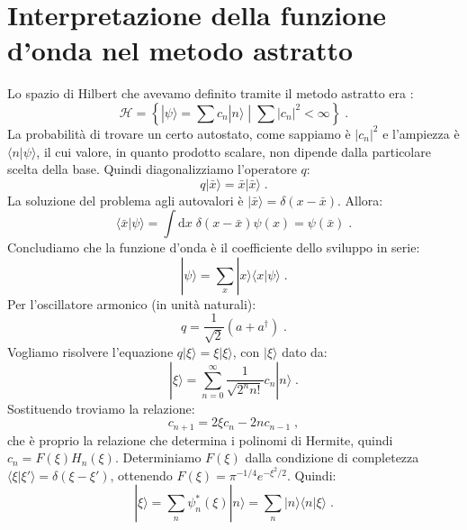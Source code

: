 \documentclass[12pt,a4paper]{report}
\theoremstyle{definition}
\newcommand{\ham}{\mathcal{H}}
\numberwithin{equation}{section}
\newcommand{\diff}[1][]{\mathrm{d}#1}
\newcommand{\bra}{\langle}
\newcommand{\ket}{\rangle}
\newcommand{\adj}[1]{#1^{\dagger}}
\begin{document}
\section{Interpretazione della funzione d'onda nel metodo astratto}
Lo spazio di Hilbert che avevamo definito tramite il metodo astratto era :
\begin{equation}
\ham =\left\{\left.|\psi\ket=\sum c_n|n\ket\;\right|\; \sum |c_n|^2<\infty\right\}\;.
\end{equation}
La probabilità di trovare un certo autostato, come sappiamo è $|c_n|^2$ e l'ampiezza è $\bra n|\psi\ket$, il cui valore, in quanto prodotto scalare, non dipende dalla particolare scelta della base. Quindi diagonalizziamo l'operatore $q$:
\begin{equation}
q|\bar{x}\ket=\bar{x}|\bar{x}\ket\;.
\end{equation}
La soluzione del problema agli autovalori è $|\bar{x}\ket=\delta(x-\bar{x})$. Allora:
$$
\bra\bar{x}|\psi\ket=\int\diff{x}\; \delta(x-\bar{x})\psi(x)=\psi(\bar{x})\;.
$$
Concludiamo che la funzione d'onda è il coefficiente dello sviluppo in serie:
\begin{equation}
|\psi\ket=\sum_x |x\ket\bra x|\psi\ket\;.
\end{equation}
Per l'oscillatore armonico (in unità naturali):
$$
q=\frac{1}{\sqrt{2}}(a+\adj{a})\;.
$$
Vogliamo risolvere l'equazione $q|\xi\ket=\xi|\xi\ket$, con $|\xi\ket$ dato da:
\begin{equation}
|\xi\ket=\sum_{n=0}^{\infty} \frac{1}{\sqrt{2^n n!}}c_n|n\ket\;.
\end{equation}
Sostituendo troviamo la relazione:
\begin{equation}
c_{n+1}=2\xi c_n-2nc_{n-1}\;,
\end{equation}
che è proprio la relazione che determina i polinomi di Hermite, quindi $c_n=F(\xi)H_n(\xi)$. Determiniamo $F(\xi)$ dalla condizione di completezza $\bra\xi|\xi'\ket=\delta(\xi-\xi')$, ottenendo $F(\xi)=\pi^{-1/4}e^{-\xi^2/2}$. Quindi:
\begin{equation}
|\xi\ket=\sum_n \psi^*_n(\xi)|n\ket=\sum_n |n\ket\bra n|\xi\ket\;.
\end{equation}
\end{document}
